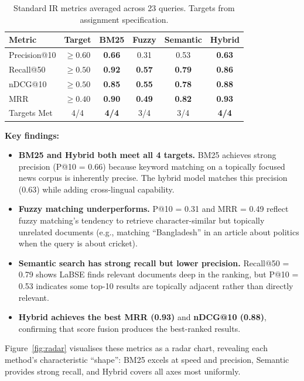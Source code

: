 \documentclass[12pt,a4paper]{article}
\begin{document}
\begin{table}[H]
\centering
\caption{Standard IR metrics averaged across 23 queries. Targets from assignment specification.}
\label{tab:eval_metrics}
\begin{tabular}{lccccc}
\toprule
\textbf{Metric} & \textbf{Target} & \textbf{BM25} & \textbf{Fuzzy} & \textbf{Semantic} & \textbf{Hybrid} \\
\midrule
Precision@10    & $\geq 0.60$ & \textbf{0.66} & 0.31 & 0.53 & \textbf{0.63} \\
Recall@50       & $\geq 0.50$ & \textbf{0.92} & \textbf{0.57} & \textbf{0.79} & \textbf{0.86} \\
nDCG@10         & $\geq 0.50$ & \textbf{0.85} & \textbf{0.55} & \textbf{0.78} & \textbf{0.88} \\
MRR             & $\geq 0.40$ & \textbf{0.90} & \textbf{0.49} & \textbf{0.82} & \textbf{0.93} \\
\midrule
Targets Met     & 4/4 & \textbf{4/4} & 3/4 & 3/4 & \textbf{4/4} \\
\bottomrule
\end{tabular}
\end{table}

\textbf{Key findings:}
\begin{itemize}
    \item \textbf{BM25 and Hybrid both meet all 4 targets.} BM25 achieves strong precision (P@10 = 0.66) because keyword matching on a topically focused news corpus is inherently precise. The hybrid model matches this precision (0.63) while adding cross-lingual capability.
    \item \textbf{Fuzzy matching underperforms.} P@10 = 0.31 and MRR = 0.49 reflect fuzzy matching's tendency to retrieve character-similar but topically unrelated documents (e.g., matching ``Bangladesh'' in an article about politics when the query is about cricket).
    \item \textbf{Semantic search has strong recall but lower precision.} Recall@50 = 0.79 shows LaBSE finds relevant documents deep in the ranking, but P@10 = 0.53 indicates some top-10 results are topically adjacent rather than directly relevant.
    \item \textbf{Hybrid achieves the best MRR (0.93)} and \textbf{nDCG@10 (0.88)}, confirming that score fusion produces the best-ranked results.
\end{itemize}

Figure~\ref{fig:radar} visualises these metrics as a radar chart, revealing each method's characteristic ``shape'': BM25 excels at speed and precision, Semantic provides strong recall, and Hybrid covers all axes most uniformly.
\end{document}

